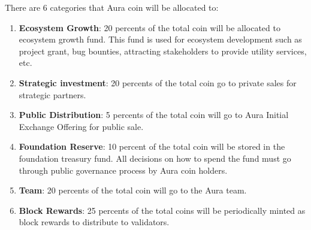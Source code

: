 \documentclass[12pt]{article}
\begin{document}
There are 6 categories that Aura coin will be allocated to:
\begin{enumerate}
    \item \textbf{Ecosystem Growth}: 20 percents of the total coin will be allocated to ecosystem growth fund. This fund is used for ecosystem development such as project grant, bug bounties, attracting stakeholders to provide utility services, etc. 
    \item \textbf{Strategic investment}: 20 percents of the total coin go to private sales for strategic partners.
    \item \textbf{Public Distribution}: 5 percents of the total coin will go to Aura Initial Exchange Offering for public sale.
    \item \textbf{Foundation Reserve}: 10 percent of the total coin will be stored in the foundation treasury fund. All decisions on how to spend the fund must go through public governance process by Aura coin holders. 
    \item \textbf{Team}: 20 percents of the total coin will go to the Aura team.
    \item \textbf{Block Rewards}: 25 percents of the total coins will be periodically minted as block rewards to distribute to validators.
\end{enumerate}



\end{document}
